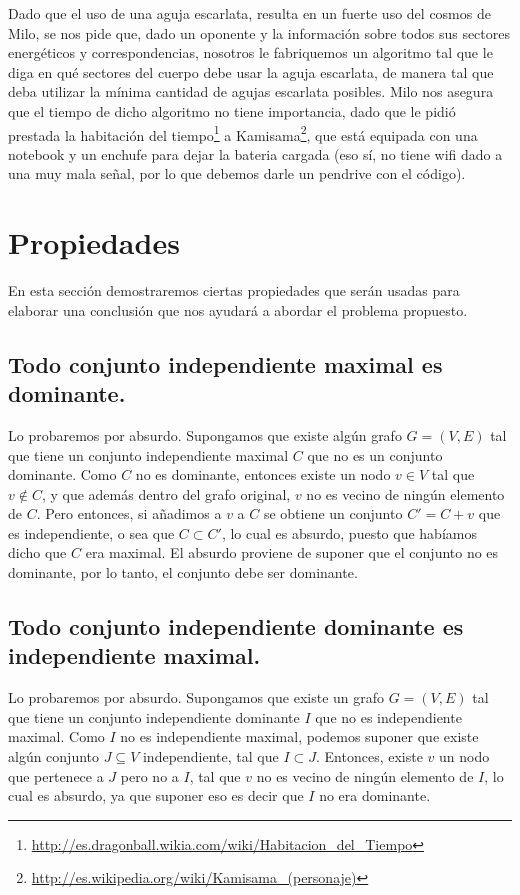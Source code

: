 \documentclass[a4paper]{article}
\begin{document}
Dado que el uso de una aguja escarlata, resulta en un fuerte uso del cosmos de Milo, se nos pide que, dado un oponente y la información sobre todos sus sectores energéticos y correspondencias, nosotros le fabriquemos un algoritmo tal que le diga en qué sectores del cuerpo debe usar la aguja escarlata, de manera tal que deba utilizar la mínima cantidad de agujas escarlata posibles. Milo nos asegura que el tiempo de dicho algoritmo no tiene importancia, dado que le pidió prestada la habitación del tiempo\footnote{\url{http://es.dragonball.wikia.com/wiki/Habitacion_del_Tiempo}} a Kamisama\footnote{\url{http://es.wikipedia.org/wiki/Kamisama_(personaje)}}, que está equipada con una notebook y un enchufe para dejar la bateria cargada (eso sí, no tiene wifi dado a una muy mala señal, por lo que debemos darle un pendrive con el código).




\section{Propiedades}

En esta sección demostraremos ciertas propiedades que serán usadas para elaborar una conclusión que nos ayudará a abordar el problema propuesto.

\subsection{Todo conjunto independiente maximal es dominante.}
Lo probaremos por absurdo.  Supongamos que existe algún grafo $G = (V,E)$ tal que tiene un conjunto independiente maximal $C$ que no es un conjunto dominante. Como $C$ no es dominante, entonces existe un nodo $v \in V$ tal que $v \not \in C$, y que además dentro del grafo original, $v$ no es vecino de ningún elemento de $C$. Pero entonces, si añadimos a $v$ a $C$ se obtiene un conjunto $C' = {C + v}$ que es independiente, o sea que $C \subset C'$, lo cual es absurdo, puesto que habíamos dicho que $C$ era maximal. El absurdo proviene de suponer que el conjunto no es dominante, por lo tanto, el conjunto debe ser dominante.

\subsection{Todo conjunto independiente dominante es independiente maximal.}
Lo probaremos por absurdo.  Supongamos que existe un grafo $G = (V,E)$ tal que tiene un conjunto independiente dominante $I$ que no es independiente maximal. Como $I$ no es independiente maximal, podemos suponer que existe algún conjunto $J \subseteq V$ independiente, tal que $I \subset J$. Entonces, existe $v$ un nodo que pertenece a $J$ pero no a $I$, tal que $v$ no es vecino de ningún elemento de $I$, lo cual es absurdo, ya que suponer eso es decir que $I$ no era dominante. 
\end{document}
